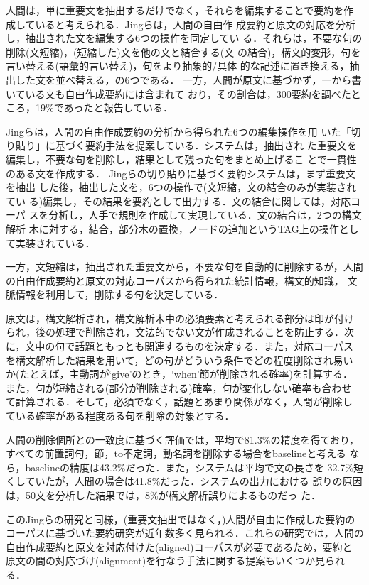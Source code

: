 人間は，単に重要文を抽出するだけでなく，それらを編集することで要約を作
成していると考えられる．Jingら\cite{jing:99:a,jing:00:b}は，人間の自由作
成要約と原文の対応を分析し，抽出された文を編集する6つの操作を同定してい
る．それらは，不要な句の削除(文短縮)，(短縮した)文を他の文と結合する(文
の結合)，構文的変形，句を言い替える(語彙的言い替え)，句をより抽象的/具体 
的な記述に置き換える，抽出した文を並べ替える，の6つである．
一方，人間が原文に基づかず，一から書いている文も自由作成要約には含まれて
おり，その割合は，300要約を調べたところ，19\%であったと報告している．

Jingら\cite{jing:00:b}は，人間の自由作成要約の分析から得られた6つの編集操作を用
いた「切り貼り」に基づく要約手法を提案している．システムは，抽出され
た重要文を編集し，不要な句を削除し，結果として残った句をまとめ上げるこ
とで一貫性のある文を作成する．
Jingらの切り貼りに基づく要約システムは，まず重要文を抽出
した後，抽出した文を，6つの操作で(文短縮，文の結合のみが実装されてい
る)編集し，その結果を要約として出力する．文の結合に関しては，対応コーパ
スを分析し，人手で規則を作成して実現している．文の結合は，2つの構文解析
木に対する，結合，部分木の置換，ノードの追加というTAG上の操作とし
て実装されている．

一方，文短縮は，抽出された重要文から，不要な句を自動的に削除するが，人間
の自由作成要約と原文の対応コーパスから得られた統計情報，構文的知識，
文脈情報を利用して，削除する句を決定している\cite{jing:00:a}．

原文は，構文解析され，構文解析木中の必須要素と考えられる部分は印が付け
られ，後の処理で削除され，文法的でない文が作成されることを防止する．次
に，文中の句で話題ともっとも関連するものを決定する．また，対応コーパス
を構文解析した結果を用いて，どの句がどういう条件でどの程度削除され易い
か(たとえば，主動詞が`give'のとき，`when'節が削除される確率)を計算する．
また，句が短縮される(部分が削除される)確率，句が変化しない確率も合わせ
て計算される．そして，必須でなく，話題とあまり関係がなく，人間が削除し
ている確率がある程度ある句を削除の対象とする．

人間の削除個所との一致度に基づく評価では，平均で81.3\%の精度を得ており，
すべての前置詞句，節，to不定詞，動名詞を削除する場合をbaselineと考える
なら，baselineの精度は43.2\%だった．また，システムは平均で文の長さを
32.7\%短くしていたが，人間の場合は41.8\%だった．システムの出力における
誤りの原因は，50文を分析した結果では，8\%が構文解析誤りによるものだっ
た．

このJingらの研究と同様，(重要文抽出ではなく，)人間が自由に作成した要約の
コーパスに基づいた要約研究が近年数多く見られる．これらの研究では，人間の
自由作成要約と原文を対応付けた(aligned)コーパスが必要であるため，要約と
原文の間の対応づけ(alignment)を行なう手法に関する提案もいくつか見られる．

